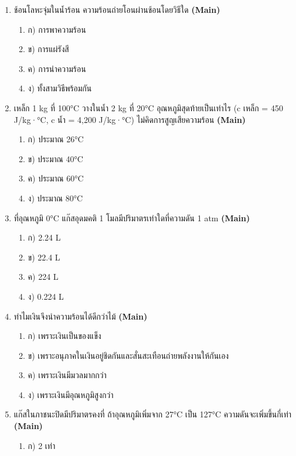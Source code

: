 \documentclass[12pt]{article}
\begin{document}
\begin{enumerate}[label=\arabic*.]
\begin{enumerate}[label=)]
\item ค) Stable Temperature and Pressure
\item ง) Standard Thermal Process
\end{enumerate}
\item ช้อนโลหะจุ่มในน้ำร้อน ความร้อนถ่ายโอนผ่านช้อนโดยวิธีใด \hfill \textbf{\small (Main)}
\begin{enumerate}[label=)]
\item ก) การพาความร้อน
\item ข) การแผ่รังสี
\item ค) การนำความร้อน
\item ง) ทั้งสามวิธีพร้อมกัน
\end{enumerate}
\item เหล็ก 1 kg ที่ 100°C วางในน้ำ 2 kg ที่ 20°C อุณหภูมิสุดท้ายเป็นเท่าไร (c เหล็ก = 450 J/kg·°C, c น้ำ = 4,200 J/kg·°C) ไม่คิดการสูญเสียความร้อน \hfill \textbf{\small (Main)}
\begin{enumerate}[label=)]
\item ก) ประมาณ 26°C
\item ข) ประมาณ 40°C
\item ค) ประมาณ 60°C
\item ง) ประมาณ 80°C
\end{enumerate}
\item ที่อุณหภูมิ 0°C แก๊สอุดมคติ 1 โมลมีปริมาตรเท่าใดที่ความดัน 1 atm \hfill \textbf{\small (Main)}
\begin{enumerate}[label=)]
\item ก) 2.24 L
\item ข) 22.4 L
\item ค) 224 L
\item ง) 0.224 L
\end{enumerate}
\item ทำไมเงินจึงนำความร้อนได้ดีกว่าไม้ \hfill \textbf{\small (Main)}
\begin{enumerate}[label=)]
\item ก) เพราะเงินเป็นของแข็ง
\item ข) เพราะอนุภาคในเงินอยู่ชิดกันและสั่นสะเทือนถ่ายพลังงานให้กันเอง
\item ค) เพราะเงินมีมวลมากกว่า
\item ง) เพราะเงินมีอุณหภูมิสูงกว่า
\end{enumerate}
\item แก๊สในภาชนะปิดมีปริมาตรคงที่ ถ้าอุณหภูมิเพิ่มจาก 27°C เป็น 127°C ความดันจะเพิ่มขึ้นกี่เท่า \hfill \textbf{\small (Main)}
\begin{enumerate}[label=)]
\item ก) 2 เท่า

\end{enumerate}
\end{enumerate}
\end{document}
